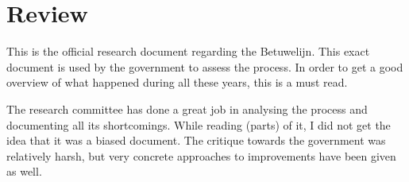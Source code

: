 \section{Review}
This is the official research document regarding the Betuwelijn. 
This exact document is used by the government to assess the process.
In order to get a good overview of what happened during all these years, this is a must read.

The research committee has done a great job in analysing the process and documenting all its shortcomings. 
While reading (parts) of it, I did not get the idea that it was a biased document. 
The critique towards the government was relatively harsh, but very concrete approaches to improvements have been given as well.
